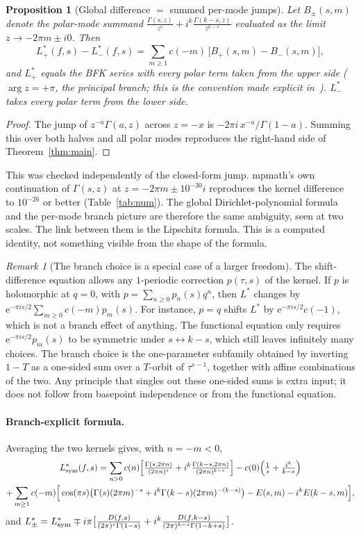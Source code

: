 \documentclass[11pt]{article}
\newtheorem{proposition}[theorem]{Proposition}
\theoremstyle{definition}
\theoremstyle{remark}
\newtheorem{remark}[theorem]{Remark}
\newcommand{\e}{\mathrm{e}}
\begin{document}
\begin{proposition}[Global difference $=$ summed per-mode jumps]\label{prop:jump}
Let $B_\pm(s,m)$ denote the polar-mode summand
$\frac{\Gamma(s,z)}{z^s}+i^k\frac{\Gamma(k-s,z)}{z^{k-s}}$ evaluated as the limit $z\to-2\pi m\pm i0$. Then
\[
L^*_+(f,s)-L^*_-(f,s)=\sum_{m\ge1}c(-m)\,\big[B_+(s,m)-B_-(s,m)\big],
\]
and $L^*_+$ equals the BFK series with every polar term taken from the upper side
($\arg z=+\pi$, the principal branch; this is the convention made explicit
in~\cite{DLRR}). $L^*_-$ takes every polar term from the lower side.
\end{proposition}
\begin{proof}
The jump of $z^{-a}\Gamma(a,z)$ across $z=-x$ is $-2\pi i\,x^{-a}/\Gamma(1-a)$. Summing this over
both halves and all polar modes reproduces the right-hand side of Theorem~\ref{thm:main}.
\end{proof}
This was checked independently of the closed-form jump. mpmath's own continuation of
$\Gamma(s,z)$ at $z=-2\pi m\pm10^{-30}i$ reproduces the kernel difference to $10^{-26}$ or better
(Table~\ref{tab:num}). The global Dirichlet-polynomial formula and the per-mode branch
picture are therefore the same ambiguity, seen at two scales. The link between them is
the Lipschitz formula. This is a computed identity, not something visible from the
shape of the formula.

\begin{remark}[The branch choice is a special case of a larger freedom]
The shift-difference equation allows any $1$-periodic correction $p(\tau,s)$ of the kernel. If $p$
is holomorphic at $q=0$, with $p=\sum_{n\ge0}p_n(s)q^n$, then $L^*$ changes by
$\e^{-\pi is/2}\sum_{m\ge0}c(-m)p_m(s)$. For instance, $p=q$ shifts $L^*$ by $\e^{-\pi is/2}c(-1)$,
which is not a branch effect of anything. The functional equation only requires
$\e^{-\pi is/2}p_m(s)$ to be symmetric under $s\leftrightarrow k-s$, which still leaves infinitely many
choices. The branch choice is the one-parameter subfamily obtained by inverting $1-T$ as a
one-sided sum over a $T$-orbit of $\tau^{s-1}$, together with affine combinations of the
two. Any principle that singles out these one-sided sums is extra input; it does not
follow from basepoint independence or from the functional equation.
\end{remark}

\paragraph{Branch-explicit formula.}
Averaging the two kernels gives, with $n=-m<0$,
\begin{multline*}
L^*_{\rm sym}(f,s)=\sum_{n>0}c(n)\Big[\tfrac{\Gamma(s,2\pi n)}{(2\pi n)^s}+i^k\tfrac{\Gamma(k-s,2\pi n)}{(2\pi n)^{k-s}}\Big]
-c(0)\Big(\tfrac1s+\tfrac{i^k}{k-s}\Big)\\
+\sum_{m\ge1}c(-m)\Big[\cos(\pi s)\big(\Gamma(s)(2\pi m)^{-s}+i^k\Gamma(k-s)(2\pi m)^{-(k-s)}\big)-E(s,m)-i^kE(k-s,m)\Big],
\end{multline*}
and $L^*_\pm=L^*_{\rm sym}\mp i\pi\big[\tfrac{D(f,s)}{(2\pi)^s\Gamma(1-s)}+i^k\tfrac{D(f,k-s)}{(2\pi)^{k-s}\Gamma(1-k+s)}\big]$.
\end{document}
